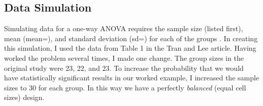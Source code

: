 \documentclass[
  11pt,
]{book}
\begin{document}
\hypertarget{data-simulation-2}{%
\subsection{Data Simulation}\label{data-simulation-2}}

Simulating data for a one-way ANOVA requires the sample size (listed first), mean (mean=), and standard deviation (sd=) for each of the groups \citep{crump_simulating_2018}. In creating this simulation, I used the data from Table 1 in the Tran and Lee \citeyearpar{tran_you_2014} article. Having worked the problem several times, I made one change. The group sizes in the original study were 23, 22, and 23. To increase the probability that we would have statistically significant results in our worked example, I increased the sample sizes to 30 for each group. In this way we have a perfectly \emph{balanced} (equal cell sizes) design.
\end{document}
